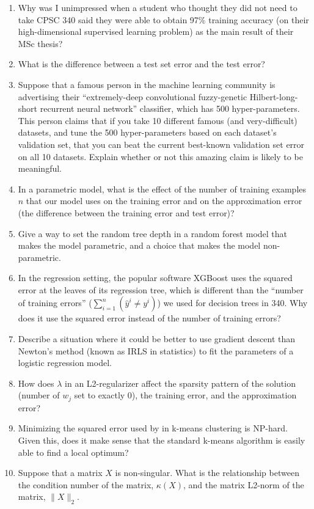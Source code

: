 \documentclass{article}
\def\blu#1{{\color{blu}#1}}
\def\norm#1{\|#1\|}
\def\enum#1{\begin{enumerate}#1\end{enumerate}}
\begin{document}
\blu{
\enum{
\item Why was I unimpressed when a student who thought they did not need to take CPSC 340 said they were able to obtain 97\% training accuracy (on their high-dimensional supervised learning problem) as the main result of their MSc thesis?
\item What is the difference between a test set error and the test error?
\item Suppose that a famous person in the machine learning community is advertising their  ``extremely-deep convolutional fuzzy-genetic Hilbert-long-short recurrent neural network'' classifier, which has 500 hyper-parameters. This person claims that if you take 10 different famous (and very-difficult) datasets, and tune the 500 hyper-parameters based on each dataset's validation set, that you can beat the current best-known validation set error on all 10 datasets. Explain whether or not this amazing claim is likely to be meaningful.
\item In a parametric model, what is the effect of the number of training examples $n$ that our model uses on the training error and on the approximation error (the difference between the training error and test error)? 
\item Give a way to set the random tree depth in a random forest model that makes the model parametric, and a choice that makes the model non-parametric.
\item In the regression setting, the popular software XGBoost uses the squared error at the leaves of its regression tree, which is different than the ``number of training errors'' ($\sum_{i=1}^n(\hat{y}^i{\neq} {y}^i)$) we used for decision trees in 340. Why does it use the squared error instead of the number of training errors?
\item Describe a situation where it could be better to use gradient descent than Newton's method (known as IRLS in statistics) to fit the parameters of a logistic regression model.
\item  How does $\lambda$ in an L2-regularizer affect the sparsity pattern of the solution (number of $w_j$ set to exactly 0), the training error, and the approximation error?
\item Minimizing the squared error used by in k-means clustering is NP-hard. Given this, does it make sense that the standard k-means algorithm is easily able to find a local optimum?
\item Suppose that a matrix $X$ is non-singular. What is the relationship between the condition number of the matrix, $\kappa(X)$, and the matrix L2-norm of the matrix, $\norm{X}_2$.
}}
\end{document}
